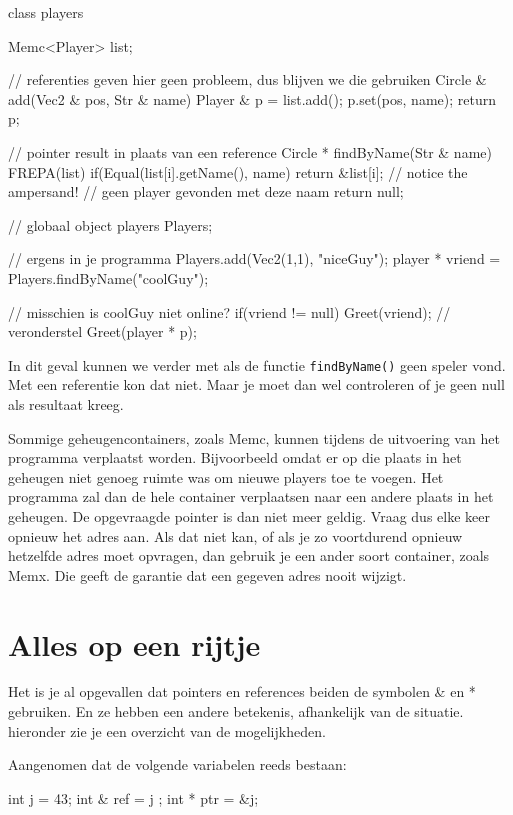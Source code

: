 \begin{code}
class players {
  Memc<Player> list;
  
  // referenties geven hier geen probleem, dus blijven we die gebruiken	
  Circle &  add(Vec2 & pos, Str & name) {
    Player & p = list.add();
    p.set(pos, name);
    return p;
  }	  

  // pointer result in plaats van een reference	
  Circle * findByName(Str & name) {
    FREPA(list) {
      if(Equal(list[i].getName(), name) {
        return &list[i]; // notice the ampersand!
      }
    }
    // geen player gevonden met deze naam
    return null;
  }	
}
// globaal object
players Players;

// ergens in je programma 
Players.add(Vec2(1,1), "niceGuy");
player * vriend = Players.findByName("coolGuy");

// misschien is coolGuy niet online?
if(vriend != null) {
  Greet(vriend); // veronderstel Greet(player * p);
}
\end{code} 

In dit geval kunnen we verder met als de functie \texttt{findByName()} geen speler vond. Met een referentie kon dat niet. Maar je moet dan wel controleren of je geen null als resultaat kreeg.

\begin{note}
Sommige geheugencontainers, zoals Memc, kunnen tijdens de uitvoering van het programma verplaatst worden. Bijvoorbeeld omdat er op die plaats in het geheugen niet genoeg ruimte was om nieuwe players toe te voegen. Het programma zal dan de hele container verplaatsen naar een andere plaats in het geheugen. De opgevraagde pointer is dan niet meer geldig. Vraag dus elke keer opnieuw het adres aan. Als dat niet kan, of als je zo voortdurend opnieuw hetzelfde adres moet opvragen, dan gebruik je een ander soort container, zoals Memx. Die geeft de garantie dat een gegeven adres nooit wijzigt.
\end{note} 

\section{Alles op een rijtje}
Het is je al opgevallen dat pointers en references beiden de symbolen \& en * gebruiken. En ze hebben een andere betekenis, afhankelijk van de situatie. hieronder zie je een overzicht van de mogelijkheden.

Aangenomen dat de volgende variabelen reeds bestaan:

\begin{code}
int   j   = 43;
int & ref = j ;
int * ptr = &j;
\end{code}

